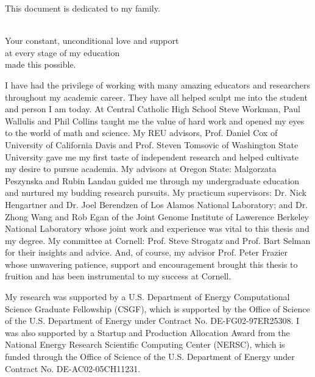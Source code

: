 \documentclass[phd,tocprelim]{cornell}
\begin{document}
\begin{dedication}
This document is dedicated to my family.

\ \\

Your constant, unconditional love and support \\
at every stage of my education \\
made this possible.
\end{dedication}

\begin{acknowledgements}
I have had the privilege of working with many amazing educators and researchers throughout my academic career. They have all helped sculpt me into the student and person I am today. At Central Catholic High School Steve Workman, Paul Wallulis and Phil Collins taught me the value of hard work and opened my eyes to the world of math and science. My REU advisors, Prof. Daniel Cox of University of California Davis and Prof. Steven Tomsovic of Washington State University gave me my first taste of independent research and helped cultivate my desire to pursue academia. My advisors at Oregon State: Malgorzata Peszynska and Rubin Landau guided me through my undergraduate education and nurtured my budding research pursuits. My practicum supervisors: Dr. Nick Hengartner and Dr. Joel Berendzen of Los Alamos National Laboratory; and Dr. Zhong Wang and Rob Egan of the Joint Genome Institute of Lawerence Berkeley National Laboratory whose joint work and experience was vital to this thesis and my degree. My committee at Cornell: Prof. Steve Strogatz and Prof. Bart Selman for their insights and advice. And, of course, my advisor Prof. Peter Frazier whose unwavering patience, support and encouragement brought this thesis to fruition and has been instrumental to my success at Cornell.

My research was supported by a U.S. Department of Energy Computational Science Graduate Fellowship (CSGF), which is supported by the Office of Science of the U.S. Department of Energy under Contract No. DE-FG02-97ER25308. I was also supported by a Startup and Production Allocation Award from the National Energy Research Scientific Computing Center (NERSC), which is funded through the Office of Science of the U.S. Department of Energy under Contract No. DE-AC02-05CH11231.
\end{acknowledgements}

\contentspage
\tablelistpage
\figurelistpage

\normalspacing \setcounter{page}{1} 
\pagestyle{cornell} \addtolength{\parskip}{0.5\baselineskip}
\end{document}
